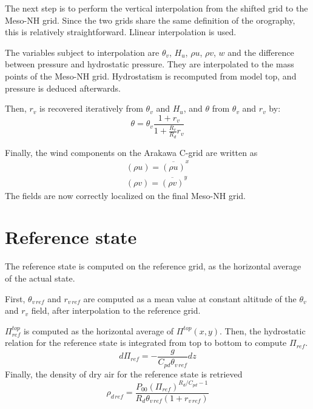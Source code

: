 The next step is to perform the vertical interpolation from the
shifted grid to the Meso-NH grid. Since the two grids share the same
definition of the orography, this is relatively straightforward.
Llinear interpolation is used.

The variables subject to interpolation are $\theta_v$, $H_u$, $\rho u$,
$\rho v$, $w$ and the difference between pressure and hydrostatic pressure.
They are interpolated to the mass points of the Meso-NH grid.
Hydrostatism is recomputed from model top, and pressure is deduced afterwards.

Then, $r_v$ is recovered iteratively from $\theta_v$ and $H_u$, and $\theta$
from $\theta_v$ and $r_v$ by:
\begin{equation}
\theta=\theta_v\frac{1+r_v}{1+\frac{R_v}{R_d}r_v}
\end{equation}

Finally, the wind components on the Arakawa C-grid are written as
\begin{eqnarray}
(\rho u)=\overline{(\rho u)}^x \\
(\rho v)=\overline{(\rho v)}^y
\end{eqnarray}
The fields are now correctly localized on the final Meso-NH grid.

\section{Reference state}

The reference state is computed on the reference grid, as the horizontal
average of the actual state.

First, $\theta_{v\,ref}$ and $r_{v\,ref}$ are computed as a mean value at
constant altitude of the $\theta_v$ and $r_v$ field, after interpolation
to the reference grid.

$\Pi_{ref}^{top}$ is computed as the horizontal average of $\Pi^{top}(x,y)$.
Then, the hydrostatic relation for the reference state
is integrated from top to bottom to compute $\Pi_{ref}$.
\begin{equation}
d\Pi_{ref}=-\frac{g}{C_{pd}\theta_{v\,ref}}dz
\end{equation}
Finally, the density of dry air for the reference state is retrieved
\begin{equation}
\rho_{d\,ref}=\frac{P_{00}(\Pi_{ref})^{R_d/C_{pd}-1}}
{R_d \theta_{v\,ref}(1+r_{v\,ref})}
\end{equation}


